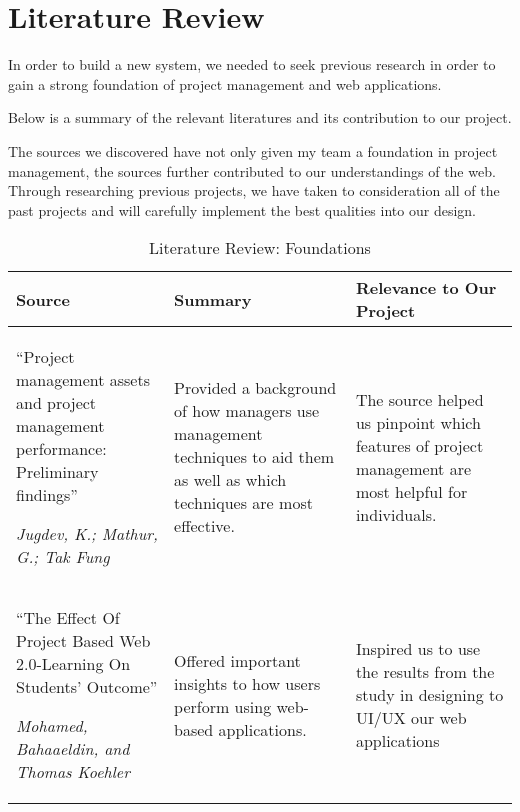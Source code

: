 \section{Literature Review}

In order to build a new system, we needed to seek previous research in order to gain a strong foundation of project management and web applications. 

Below is a summary of  the relevant literatures and its contribution to our project.

\par The sources we discovered have not only given my team a foundation in project management, the sources further contributed to our understandings of the web. Through researching previous projects, we have taken to consideration all of the past projects and will carefully implement the best qualities into our design. 

\FloatBarrier
\begin{table}%
\caption{Literature Review: Foundations}\label{FoundationLitReview}
\begin{tabularx}{\textwidth}{|X|X|X|}
    \hline
    \textbf{Source} & \textbf{Summary} & \textbf{Relevance to Our Project}\\
    \hline
    ``Project management assets and project management performance: Preliminary findings''
     \par \textit{Jugdev, K.; Mathur, G.; Tak Fung} & Provided a background of how managers use management techniques to aid them as well as which techniques are most effective. & The source helped us pinpoint which features of project management are most helpful for individuals. \\
    \hline 
    ``The Effect Of Project Based Web 2.0-Learning On Students' Outcome''
	\par \textit{Mohamed, Bahaaeldin, and Thomas Koehler} & Offered important insights to how users perform using web-based applications. & Inspired us to use the results from the study in designing to UI/UX our web applications \\
	\hline
\end{tabularx}
\end{table}%

